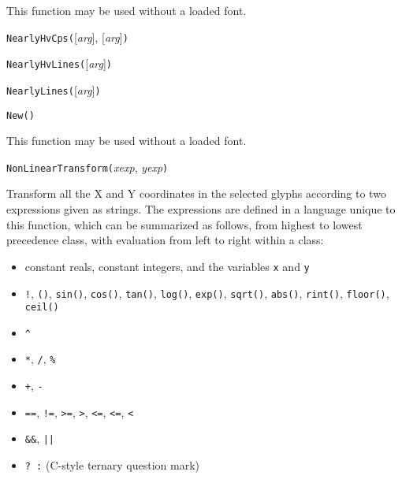 This function may be used without a loaded font.



\texttt{NearlyHvCps(}[\textit{arg}], [\textit{arg}]\texttt{)}



\texttt{NearlyHvLines(}[\textit{arg}]\texttt{)}



\texttt{NearlyLines(}[\textit{arg}]\texttt{)}



\texttt{New(}\texttt{)}

This function may be used without a loaded font.



\texttt{NonLinearTransform(}\textit{xexp}, \textit{yexp}\texttt{)}

Transform all the X and Y coordinates in the selected glyphs according to
two expressions given as strings.  The expressions are defined in a language
unique to this function, which can be summarized as follows, from highest to
lowest precedence class, with evaluation from left to right within a class:
\begin{itemize}
  \item constant reals, constant integers, and the variables \texttt{x} and
    \texttt{y}
  \item \texttt{!}, \texttt{()}, \texttt{sin()}, \texttt{cos()},
    \texttt{tan()}, \texttt{log()}, \texttt{exp()}, \texttt{sqrt()},
    \texttt{abs()}, \texttt{rint()}, \texttt{floor()},
    \texttt{ceil()}
  \item \texttt{\textasciicircum}
  \item \texttt{*}, \texttt{/}, \texttt{\%}
  \item \texttt{+}, \texttt{-}
  \item \texttt{==}, \texttt{!=}, \texttt{>=}, \texttt{>}, \texttt{<=},
    \texttt{<=}, \texttt{<}
  \item \texttt{\&\&}, \texttt{||}
  \item \texttt{?~:} (C-style ternary question mark)
\end{itemize}

